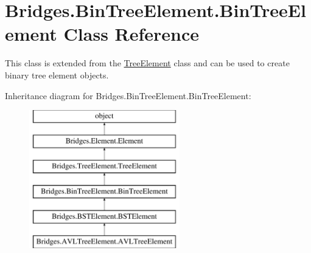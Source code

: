 \hypertarget{class_bridges_1_1_bin_tree_element_1_1_bin_tree_element}{}\section{Bridges.\+Bin\+Tree\+Element.\+Bin\+Tree\+Element Class Reference}
\label{class_bridges_1_1_bin_tree_element_1_1_bin_tree_element}


This class is extended from the \mbox{\hyperlink{namespace_bridges_1_1_tree_element}{Tree\+Element}} class and can be used to create binary tree element objects.  


Inheritance diagram for Bridges.\+Bin\+Tree\+Element.\+Bin\+Tree\+Element\+:\begin{figure}[H]
\begin{center}
\leavevmode
\includegraphics[height=6.000000cm]{class_bridges_1_1_bin_tree_element_1_1_bin_tree_element}
\end{center}
\end{figure}
